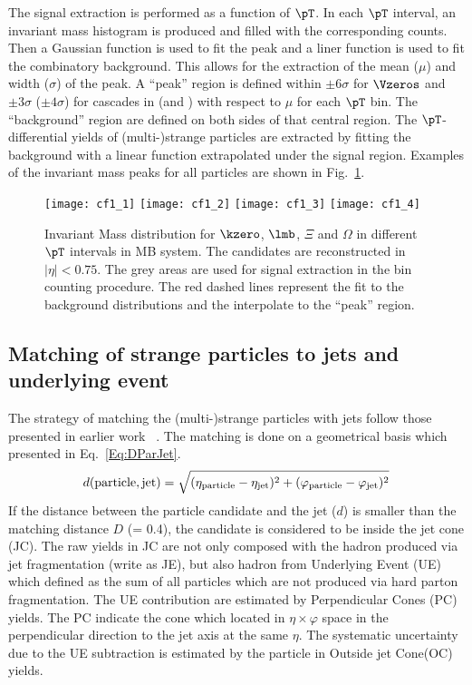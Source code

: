 The signal extraction is performed as a function of $\pT$.
In each $\pT$ interval, an invariant mass histogram is produced and filled with the corresponding counts.
Then a Gaussian function is used to fit the peak and a liner function is used to fit the combinatory background.
This allows for the extraction of the mean ($\mu$) and width ($\sigma$) of the peak.
A ``peak'' region is defined within $\pm 6\sigma$ for $\Vzeros$ and $\pm 3\sigma$ ($\pm 4\sigma$) for cascades in \pp (and \pPb) with respect to $\mu$ for each $\pT$ bin.
The ``background'' region are defined on both sides of that central region.
The $\pT$-differential yields of (multi-)strange particles are extracted by fitting the background with a linear function extrapolated under the signal region.
Examples of the invariant mass peaks for all particles are shown in Fig.~\ref{fig:InvM}.
\begin{figure}[!ht]
\begin{center}
\texttt{[image: cf1\_1]}
\texttt{[image: cf1\_2]}
\texttt{[image: cf1\_3]}
\texttt{[image: cf1\_4]}
\caption{Invariant Mass distribution for $\kzero$, $\lmb$, $\Xi$ and $\Omega$ in different $\pT$ intervals in MB \pPb system. The candidates are reconstructed in $|\eta|<0.75$.
The grey areas are used for signal extraction in the bin counting procedure.
The red dashed lines represent the fit to the background distributions and the interpolate to the ``peak'' region.}
\label{fig:InvM}
\end{center}
\end{figure}

\subsection{Matching of strange particles to jets and underlying event}%
\label{sec:ParJetMatch}

The strategy of matching the (multi-)strange particles with jets follow those presented in earlier work~\cite{V0injet} .
The matching is done on a geometrical basis which presented in Eq.~\ref{Eq:DParJet}.
\begin{equation}
	d(\mathrm{particle, jet}) = \sqrt{(\eta_\mathrm{particle} -\eta_{\rm jet})^{2} + (\varphi_\mathrm{particle} -\varphi_{\rm jet})^{2}}
	\label{Eq:DParJet}
\end{equation}
If the distance between the particle candidate and the jet ($d$) is smaller than the matching distance $D$ (= 0.4), the candidate is considered to be inside the jet cone (JC).
The raw yields in JC are not only composed with the hadron produced via jet fragmentation (write as JE), but also hadron from Underlying Event (UE) which defined as the sum of all particles which are not produced via hard parton fragmentation.
The UE contribution are estimated by Perpendicular Cones (PC) yields.
The PC indicate the cone which located in $\eta \times \varphi$ space in the perpendicular direction to the jet axis at the same $\eta$.
The systematic uncertainty due to the UE subtraction is estimated by the particle in Outside jet Cone(OC) yields. 


